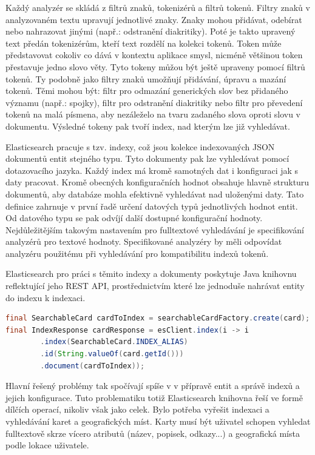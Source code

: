 		Každý analyzér se skládá z filtrů znaků, tokenizérů a filtrů tokenů.
		Filtry znaků v analyzovaném textu upravují jednotlivé znaky.
		Znaky mohou přidávat, odebírat nebo nahrazovat jinými (např.: odstranění diakritiky).
		Poté je takto upravený text předán tokenizérům, kteří text rozdělí na kolekci tokenů.
		Token může představovat cokoliv co dává v kontextu aplikace smysl, nicméně většinou token přestavuje jedno
		slovo věty.
		Tyto tokeny můžou být ještě upraveny pomocí filtrů tokenů.
		Ty podobně jako filtry znaků umožňují přidávání, úpravu a mazání tokenů.
		Těmi mohou být: filtr pro odmazání generických slov bez přidaného významu (např.: spojky), filtr pro odstranění
		diakritiky nebo filtr pro převedení tokenů na malá písmena, aby nezáleželo na tvaru zadaného slova oproti slovu
		v dokumentu.
		Výsledné tokeny pak tvoří index, nad kterým lze již vyhledávat.
		\cite{analyzer_anatomy}

		Elasticsearch pracuje s tzv. indexy, což jsou kolekce indexovaných \ac{JSON} dokumentů entit stejného typu.
		Tyto dokumenty pak lze vyhledávat pomocí dotazovacího jazyka.
		Každý index má kromě samotných dat i konfiguraci jak s daty pracovat.
		Kromě obecných konfiguračních hodnot obsahuje hlavně strukturu dokumentů, aby databáze mohla efektivně vyhledávat
		nad uloženými daty.
		Tato definice zahrnuje v první řadě určení datových typů jednotlivých hodnot entit.
		Od datového typu se pak odvíjí další dostupné konfigurační hodnoty.
		Nejdůležitějším takovým nastavením pro fulltextové vyhledávání je specifikování analyzérů pro textové hodnoty.
		Specifikované analyzéry by měli odpovídat analyzéru použitému při vyhledávání pro kompatibilitu indexů tokenů.

		Elasticsearch pro práci s těmito indexy a dokumenty poskytuje Java knihovnu reflektující jeho \ac{REST} \ac{API},
		prostřednictvím které lze jednoduše nahrávat entity do indexu k indexaci.

		\begin{lstlisting}[language=Java, caption={Ukázka indexace jedné karty do Elasticsearch databáze. Zdroj: [autor]}]
final SearchableCard cardToIndex = searchableCardFactory.create(card);
final IndexResponse cardResponse = esClient.index(i -> i
		.index(SearchableCard.INDEX_ALIAS)
		.id(String.valueOf(card.getId()))
		.document(cardToIndex));
		\end{lstlisting}

		Hlavní řešený problémy tak spočívají spíše v v přípravě entit a správě indexů a jejich konfigurace.
		Tuto problematiku totiž Elasticsearch knihovna řeší ve formě dílčích operací, nikoliv však jako celek.
		Bylo potřeba vyřešit indexaci a vyhledávání karet a geografických míst.
		Karty musí být uživatel schopen vyhledat fulltextově skrze vícero atributů (název, popisek, odkazy...) a geografická
		místa podle lokace uživatele.

